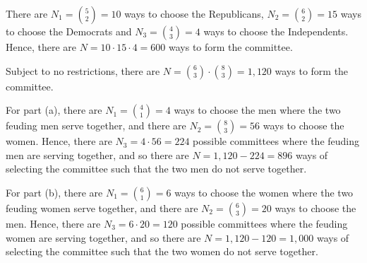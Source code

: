 \documentclass[a4paper,12pt]{article}
\begin{document}
\vspace{4mm}

\vspace{2mm}
There are $N_1 = \binom{5}{2} = 10$ ways to choose the Republicans, $N_2 = \binom{6}{2} = 15$ ways to choose the Democrats and $N_3 = \binom{4}{3} = 4$ ways to choose the Independents. Hence, there are $N = 10 \cdot 15 \cdot 4  = 600$ ways to form the committee. 

\vspace{4mm}

\vspace{2mm}
Subject to no restrictions, there are $N = \binom{6}{3} \cdot \binom{8}{3} = 1,120$ ways to form the committee. 

For part (a), there are $N_1 = \binom{4}{1} = 4$ ways to choose the men where the two feuding men serve together, and there are $N_2 = \binom{8}{3} = 56$ ways to choose the women. Hence, there are $N_3 = 4 \cdot 56 = 224$ possible committees where the feuding men are serving together, and so there are $N = 1,120 - 224 = 896$ ways of selecting the committee such that the two men do not serve together. 

For part (b), there are $N_1 = \binom{6}{1} = 6$ ways to choose the women where the two feuding women serve together, and there are $N_2 = \binom{6}{3} = 20$ ways to choose the men. Hence, there are $N_3 = 6 \cdot 20 = 120$ possible committees where the feuding women are serving together, and so there are $N = 1,120 - 120 = 1,000$ ways of selecting the committee such that the two women do not serve together.  
\end{document}
